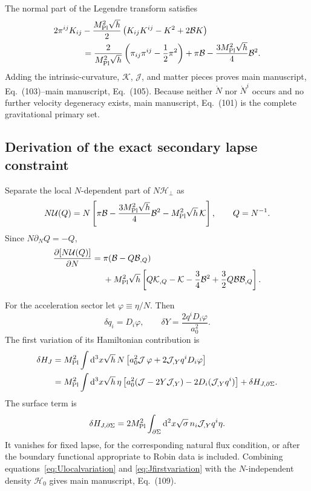 \documentclass[aps,prd,reprint,onecolumn,notitlepage,nofootinbib,longbibliography,floatfix]{revtex4-2}
\theoremstyle{scstyle}
\theoremstyle{definition}
\theoremstyle{remark}
\newcommand{\dd}{\mathrm{d}}
\newcommand{\mpl}{M_{\rm Pl}}
\newcommand{\cK}{\mathcal K}
\newcommand{\cB}{\mathcal B}
\newcommand{\cJ}{\mathcal J}
\newcommand{\cH}{\mathcal H}
\begin{document}
The normal part of the Legendre transform satisfies
\begin{align}
&2\pi^{ij}K_{ij}
-\frac{\mpl^2\sqrt h}{2}
\left(K_{ij}K^{ij}-K^2+2\cB K\right)
\nonumber\\
&\hspace{1.2cm}
=\frac{2}{\mpl^2\sqrt h}
\left(\pi_{ij}\pi^{ij}-\frac12\pi^2\right)
+\pi\cB-\frac{3\mpl^2\sqrt h}{4}\cB^2.
\label{eq:Legendreidentity}
\end{align}
Adding the intrinsic-curvature, $\cK$, $\cJ$, and matter pieces proves main manuscript, Eq.~(103)--main manuscript, Eq.~(105). Because neither $\dot N$ nor $\dot N^i$ occurs and no further velocity degeneracy exists, main manuscript, Eq.~(101) is the complete gravitational primary set.

\subsection{Derivation of the exact secondary lapse constraint}
\label{app:CNderivation}

Separate the local $N$-dependent part of $N\cH_\perp$ as
\begin{equation}
N\mathcal U(Q)
=N\left[
\pi\cB-\frac{3\mpl^2\sqrt h}{4}\cB^2
-\mpl^2\sqrt h\,\cK
\right],
\qquad Q=N^{-1}.
\label{eq:Ulocal}
\end{equation}
Since $N\partial_NQ=-Q$,
\begin{align}
\frac{\partial[N\mathcal U(Q)]}{\partial N}
={}&\pi(\cB-Q\cB_{,Q})\nonumber\\
&+\mpl^2\sqrt h\left[
Q\cK_{,Q}-\cK
-\frac34\cB^2
+\frac32Q\cB\cB_{,Q}
\right].
\label{eq:Ulocalvariation}
\end{align}

For the acceleration sector let $\varphi\equiv\eta/N$. Then
\begin{equation}
\delta q_i=D_i\varphi,
\qquad
\delta Y=\frac{2q^iD_i\varphi}{a_0^2}.
\label{eq:qYvariation}
\end{equation}
The first variation of its Hamiltonian contribution is
\begin{align}
\delta H_J
&=\mpl^2\int\dd^3x\sqrt h\,N
\left[a_0^2\cJ\,\varphi
+2\cJ_{,Y}q^iD_i\varphi\right]\nonumber\\
&=\mpl^2\int\dd^3x\sqrt h\,\eta
\left[
 a_0^2(\cJ-2Y\cJ_{,Y})
-2D_i(\cJ_{,Y}q^i)
\right]
+\delta H_{J,\partial\Sigma}.
\label{eq:Jfirstvariation}
\end{align}
The surface term is
\begin{equation}
\delta H_{J,\partial\Sigma}
=2\mpl^2\int_{\partial\Sigma}\dd^2x\sqrt\sigma\,
 n_i\cJ_{,Y}q^i\eta.
\label{eq:Jfirstboundary}
\end{equation}
It vanishes for fixed lapse, for the corresponding natural flux condition, or after the boundary functional appropriate to Robin data is included. Combining equations~\eqref{eq:Ulocalvariation} and \eqref{eq:Jfirstvariation} with the $N$-independent density $\cH_0$ gives main manuscript, Eq.~(109).
\end{document}
